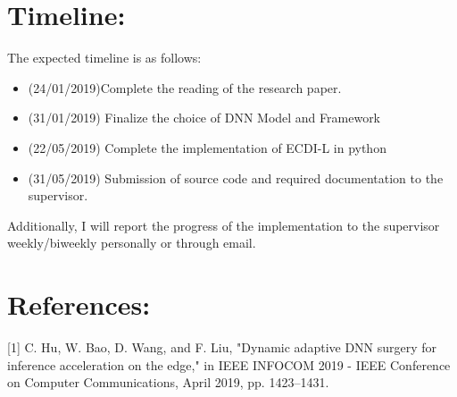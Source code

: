 \documentclass{article}
\begin{document}
\begin{normalsize}
        
    	\section{Timeline:}
        
        The expected timeline is as follows:  \\
        

        
        \begin{itemize}
        
\item(24/01/2019)Complete the reading of the research paper.
\item (31/01/2019) Finalize the choice of DNN Model and Framework
\item(22/05/2019) Complete the implementation of ECDI-L in python 
\item(31/05/2019) Submission of source code and required documentation to the supervisor.
        \end{itemize}
        
        Additionally, I will report the progress of the implementation to the supervisor weekly/biweekly personally or through email.
         
    	\section{References:}
        [1] C. Hu, W. Bao, D. Wang, and F. Liu, "Dynamic adaptive DNN surgery for inference acceleration on the edge," in IEEE INFOCOM 2019 - IEEE Conference on Computer Communications, April 2019, pp. 1423–1431.
\end{normalsize}
\end{document}
